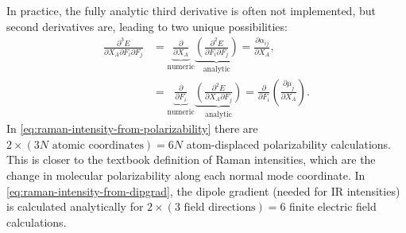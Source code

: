 \documentclass[%
class = book,%
crop = false,%
float = true,%
multi = true,%
preview = false,%
]{standalone}
\begin{document}
In practice, the fully analytic third derivative is often not implemented, but second derivatives are, leading to two unique possibilities:
\begin{align}
  \label{eq:raman-intensity-from-polarizability}
  \frac{\partial^{3} E}{\partial X_{A} \partial F_{i} \partial F_{j}} &= \underbrace{\frac{\partial}{\partial X_{A}}}_{\text{numeric}} \underbrace{\left(\frac{\partial^{2} E}{\partial F_{i} \partial F_{j}}\right)}_{\text{analytic}} = \frac{\partial \alpha_{ij}}{\partial X_{A}}, \\
  \label{eq:raman-intensity-from-dipgrad}
  &= \underbrace{\frac{\partial}{\partial F_{i}}}_{\text{numeric}} \underbrace{\left(\frac{\partial^{2} E}{\partial X_{A} \partial F_{j}}\right)}_{\text{analytic}} = \frac{\partial}{\partial F_{i}} \left( \frac{\partial \mu_{j}}{\partial X_{A}} \right).
\end{align}
In \eqref{eq:raman-intensity-from-polarizability} there are \(2 \times (3N \,\,\text{atomic coordinates}) = 6N\) atom-displaced polarizability calculations. This is closer to the textbook definition of Raman intensities, which are the change in molecular polarizability along each normal mode coordinate\cite{doi:10.1080/00268978000103541}. In \eqref{eq:raman-intensity-from-dipgrad}, the dipole gradient (needed for IR intensities) is calculated analytically for \(2 \times (3 \,\,\text{field directions}) = 6\) finite electric field calculations.

\subsection{\texorpdfstring{\href{https://chemistry.stackexchange.com/q/80335/194}{\color{black}{Finite difference for numerical derivatives}}}{Finite difference for numerical derivatives}}
\label{ssec:finite-difference-for-numerical-derivatives}
\end{document}
